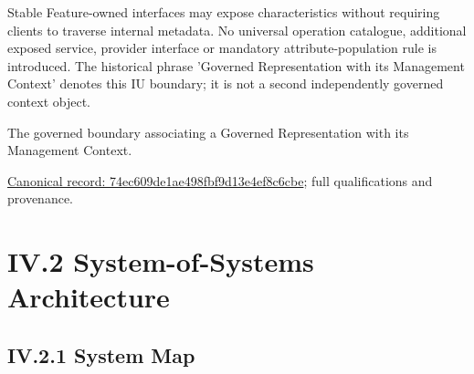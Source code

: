 Stable Feature-owned interfaces may expose characteristics without requiring clients
to traverse internal metadata. No universal operation catalogue, additional exposed
service, provider interface or mandatory attribute-population rule is introduced.
The historical phrase 'Governed Representation with its Management Context' denotes
this IU boundary; it is not a second independently governed context object.



The governed boundary associating a Governed Representation with its Management Context.


{\footnotesize \href{../../../../continuum/application/data-object/class/74ec609de1ae498fbf9d13e4ef8c6cbe.md}{Canonical record: 74ec609de1ae498fbf9d13e4ef8c6cbe}; full qualifications and provenance.}\par
\chapter*{IV.2 System-of-Systems Architecture}
\label{navigation:IV.2}

\section*{IV.2.1 System Map}
\label{navigation:IV.2.1}

